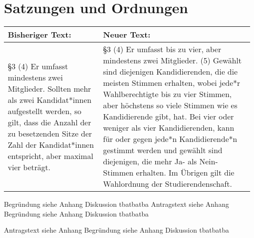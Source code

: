 \section{Satzungen und Ordnungen}

    {\begin{tabular}{|p{7.5cm}|p{7.5cm}|}
        \hline
        \textbf{Bisheriger Text:} & \textbf{Neuer Text:} \\\hline
        \S 3 \newline (4) Er umfasst mindestens zwei Mitglieder. Sollten mehr als zwei Kandidat*innen
        aufgestellt werden, so gilt, dass die Anzahl der zu besetzenden Sitze der Zahl der
        Kandidat*innen entspricht, aber maximal vier beträgt.
    &   \S 3 \newline (4) Er umfasst bis zu vier, aber mindestens zwei Mitglieder. \newline 
        (5) Gewählt sind diejenigen Kandidierenden, die die meisten Stimmen erhalten, wobei
        jede*r Wahlberechtigte bis zu vier Stimmen, aber höchstens so viele Stimmen wie es
        Kandidierende gibt, hat. Bei vier oder weniger als vier Kandidierenden, kann für oder
        gegen jede*n Kandidierende*n gestimmt werden und gewählt sind diejenigen, die mehr
        Ja- als Nein-Stimmen erhalten. Im Übrigen gilt die Wahlordnung der
        Studierendenschaft.\\\hline
        
        \end{tabular}
    }{%
        Begründung siehe Anhang
    }{%
        Diskussion
    }{tba}{tba}{tba}
    {
        Antragstext siehe Anhang
    }{
        Begründung siehe Anhang
    }{
        Diskussion
    }{tba}{tba}{tba}
    
    {
        Antragstext siehe Anhang
    }{
        Begründung siehe Anhang
    }{
        Diskussion
    }{tba}{tba}{tba}
